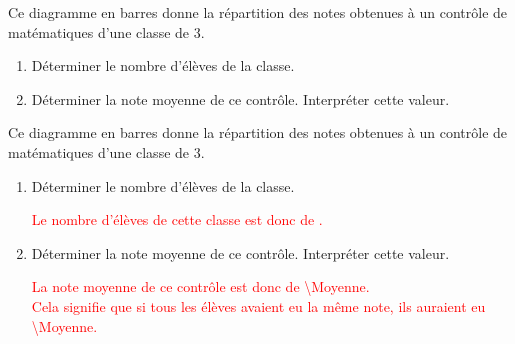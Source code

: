 \begin{exercice*}
    Ce diagramme en barres donne la répartition des notes obtenues à un contrôle de matématiques d'une classe de 3.
    \par\smallskip
    \begin{enumerate}
        \item Déterminer le nombre d'élèves de la classe.
        \item Déterminer la note moyenne de ce contrôle. Interpréter cette valeur.        
    \end{enumerate}
\end{exercice*}
\begin{corrige}
    Ce diagramme en barres donne la répartition des notes obtenues à un contrôle de matématiques d'une classe de 3.
    \par\smallskip
    \textcolor{red}{}
    \begin{enumerate}
        \item Déterminer le nombre d'élèves de la classe.
        \par\smallskip\textcolor{red}{Le nombre d'élèves de cette classe est donc de \EffectifTotal.}
        \item Déterminer la note moyenne de ce contrôle. Interpréter cette valeur.
        \par\smallskip\textcolor{red}{%
        La note moyenne de ce contrôle est donc de \num{\Moyenne}.\\        
        Cela signifie que si tous les élèves avaient eu la même note, ils auraient eu \num{\Moyenne}.
        }
    \end{enumerate}
\end{corrige}

